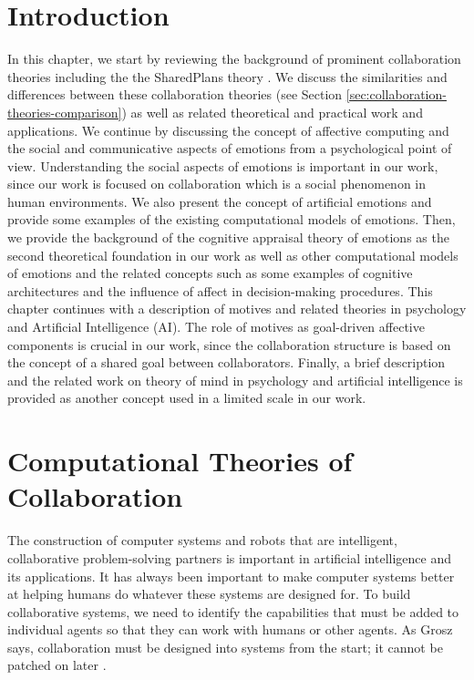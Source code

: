 \documentclass[12pt]{report}
\begin{document}
\section{Introduction}
\vspace*{-3mm}
In this chapter, we start by reviewing the background of prominent collaboration
theories including the the SharedPlans theory \cite{grosz:plans-discourse}. We
discuss the similarities and differences between these collaboration theories
(see Section \ref{sec:collaboration-theories-comparison}) as well as related
theoretical and practical work and applications. We continue by discussing the
concept of affective computing and the social and communicative aspects of
emotions from a psychological point of view. Understanding the social aspects of
emotions is important in our work, since our work is focused on collaboration
which is a social phenomenon in human environments. We also present the concept
of artificial emotions and provide some examples of the existing computational
models of emotions. Then, we provide the background of the cognitive appraisal
theory of emotions as the second theoretical foundation in our work as well as
other computational models of emotions and the related concepts such as some
examples of cognitive architectures and the influence of affect in
decision-making procedures. This chapter continues with a description of motives
and related theories in psychology and Artificial Intelligence (AI). The role of
motives as goal-driven affective components is crucial in our work, since the
collaboration structure is based on the concept of a shared goal between
collaborators. Finally, a brief description and the related work on theory of
mind in psychology and artificial intelligence is provided as another concept
used in a limited scale in our work.

\section{Computational Theories of Collaboration}
The construction of computer systems and robots that are intelligent,
collaborative problem-solving partners is important in artificial intelligence
and its applications. It has always been important to make computer systems
better at helping humans do whatever these systems are designed for. To build
collaborative systems, we need to identify the capabilities that must be added
to individual agents so that they can work with humans or other agents. As Grosz
says, collaboration must be designed into systems from the start; it cannot be
patched on later \cite{grosz:collaborative-systems}.
\end{document}
